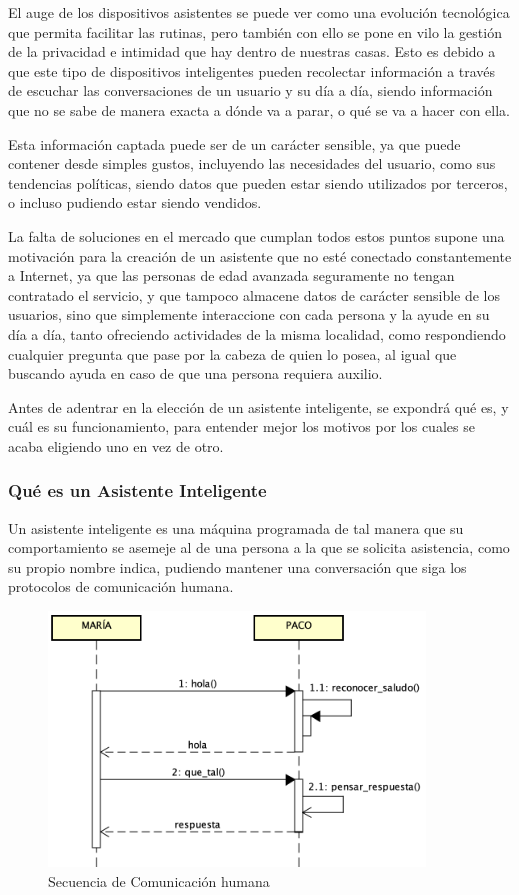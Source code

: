 El auge de los dispositivos asistentes se puede ver como una evolución tecnológica que permita facilitar las rutinas, pero también con ello se pone en vilo la gestión de la privacidad e intimidad que hay dentro de nuestras casas. Esto es debido a que este tipo de dispositivos inteligentes pueden recolectar información a través de escuchar las conversaciones de un usuario y su día a día, siendo información que no se sabe de manera exacta a dónde va a parar, o qué se va a hacer con ella.

Esta información captada puede ser de un carácter sensible, ya que puede contener desde simples gustos, incluyendo las necesidades del usuario, como sus tendencias políticas, siendo datos que pueden estar siendo utilizados por terceros, o incluso pudiendo estar siendo vendidos.

La falta de soluciones en el mercado que cumplan todos estos puntos supone una motivación para la creación de un asistente que no esté conectado constantemente a Internet, ya que las personas de edad avanzada seguramente no tengan contratado el servicio, y que tampoco almacene datos de carácter sensible de los usuarios, sino que simplemente interaccione con cada persona y la ayude en su día a día, tanto ofreciendo actividades de la misma localidad, como respondiendo cualquier pregunta que pase por la cabeza de quien lo posea, al igual que buscando ayuda en caso de que una persona requiera auxilio.

Antes de adentrar en la elección de un asistente inteligente, se expondrá qué es, y cuál es su funcionamiento, para entender mejor los motivos por los cuales se acaba eligiendo uno en vez de otro.

\subsubsection{Qué es un Asistente Inteligente}

Un asistente inteligente es una máquina programada de tal manera que su comportamiento se asemeje al de una persona a la que se solicita asistencia, como su propio nombre indica, pudiendo mantener una conversación que siga los protocolos de comunicación humana.

\begin{figure}[h!]
    \centering
    \includegraphics[width=10cm]{./img/sequence/human.png}
    \caption{Secuencia de Comunicación humana}
    \label{fig:humanseq}
\end{figure}

